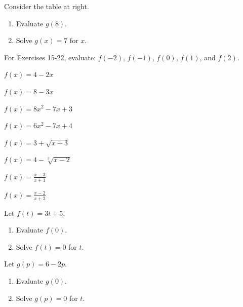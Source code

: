 \begin{enumerate}
\begin{minipage}{\linewidth}
\item  Consider the table at right.
\begin{enumerate}
    \item Evaluate $g(8)$.
    \item Solve $g(x) = 7$ for $x$.
\end{enumerate}
\end{minipage}

\vspace{24pt}

\noindent For Exercises 15-22, evaluate: $f(-2)$, $f(-1)$, $f(0)$, $f(1)$, and $f(2)$.

\item $f(x) = 4 - 2 x$
\item $f(x) = 8-3x$
\item $f(x) = 8x^2 - 7x + 3$
\item $f(x) = 6x^2 - 7x + 4$
\item $f(x) = 3 + \sqrt{x+3}$
\item $f(x) = 4 - \sqrt[3]{x-2}$
\item $f(x) = \frac{x-3}{x+1}$
\item $f(x) = \frac{x-2}{x+2}$

\item Let $f(t) = 3t+5$.
\begin{enumerate}
    \item Evaluate $f(0)$.
    \item Solve $f(t) = 0$ for $t$.
\end{enumerate}

\item Let $g(p) = 6-2p$.
\begin{enumerate}
    \item Evaluate $g(0)$.
    \item Solve $g(p) = 0$ for $t$.
\end{enumerate}


\end{enumerate}
